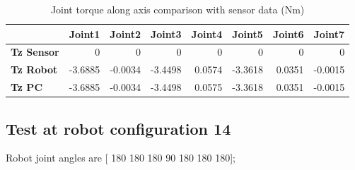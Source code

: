 \begin{table}[h!]
	\centering
	\caption{Joint torque along axis comparison with sensor data (Nm)}
	\label{wrech_Sensor_Pose13}
	\begin{tabular}{|l|r|r|r|r|r|r|r|}
		\hline
		\textbf{} & \textbf{Joint1} & \textbf{Joint2} & \textbf{Joint3} & \textbf{Joint4} & \textbf{Joint5} & \textbf{Joint6} & \textbf{Joint7} \\ \hline
		\textbf{Tz Sensor}  & 0           & 0           & 0            & 0           & 0           & 0           & 0           \\ \hline
		\textbf{Tz Robot}  	& -3.6885           & -0.0034           & -3.4498            & 0.0574           & -3.3618           & 0.0351           & -0.0015           \\ \hline
		\textbf{Tz PC}  	& -3.6885           & -0.0034           & -3.4498            & 0.0575           & -3.3618           & 0.0351           & -0.0015           \\ \hline
	\end{tabular}
\end{table}


\subsection{Test at robot configuration 14}
Robot joint angles are  [ 180  180  180   90  180  180  180];

